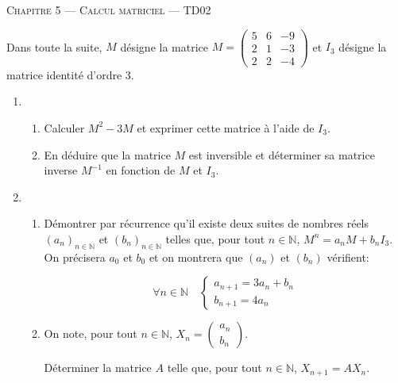 \documentclass[a4paper]{article}
\begin{document}
\begin{center}
  {\scshape\LARGE Chapitre 5 --- Calcul matriciel --- TD02 \par}
  \vspace{1.5cm}
\end{center}


\begin{exercice}{}{}

    Dans toute la suite, $M$ désigne la matrice $M=\begin{pmatrix} 5 & 6 & -9 \\ 2 & 1 & -3 \\ 2 & 2 & -4 \end{pmatrix}$ et $I_3$ désigne la matrice identité d'ordre 3.


\begin{enumerate}
    \item \begin{enumerate}
        \item Calculer $M^2 - 3M$ et exprimer cette matrice à l'aide de $I_3$.
        \item En déduire que la matrice $M$ est inversible et déterminer sa matrice inverse $M^{-1}$ en fonction de $M$ et $I_3$.
    
    \end{enumerate}

    \item \begin{enumerate}
        \item Démontrer par récurrence qu'il existe deux suites de nombres réels $(a_n)_{n \in \mathbb{N}}$ et $(b_n)_{n \in \mathbb{N}}$ telles que, pour tout $n \in \mathbb{N}$, $M^n = a_n M + b_n I_3$. On précisera $a_0$ et $b_0$ et on montrera que $(a_n)$ et $(b_n)$ vérifient:
    
        $$\forall n \in \mathbb{N} \quad \begin{cases} a_{n+1} = 3a_n+b_n \\ b_{n+1} = 4 a_n \end{cases}$$

        \item On note, pour tout $n \in \mathbb{N}$, $X_n = \begin{pmatrix} a_n \\ b_n \end{pmatrix}$.
        
        Déterminer la matrice $A$ telle que, pour tout $n \in \mathbb{N}$, $X_{n+1} = AX_n$.
    \end{enumerate}
    

\end{enumerate}
\end{exercice}
\end{document}
